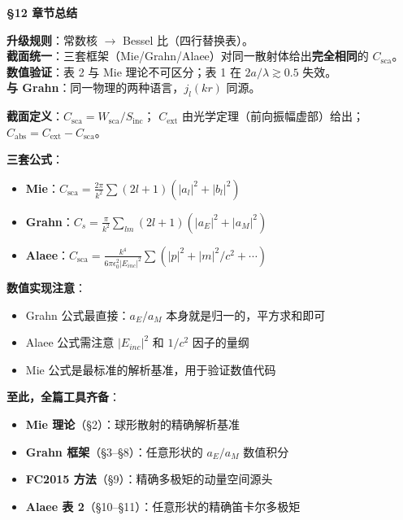 \begin{chaptersummary}

\textbf{\S12 章节总结}

\textbf{升级规则}：常数核 $\to$ Bessel 比（四行替换表）。\\
\textbf{截面统一}：三套框架（Mie/Grahn/Alaee）对同一散射体给出\textbf{完全相同}的 $C_{\text{sca}}$。\\
\textbf{数值验证}：表 2 与 Mie 理论不可区分；表 1 在 $2a/\lambda\gtrsim0.5$ 失效。\\
\textbf{与 Grahn}：同一物理的两种语言，$j_l(kr)$ 同源。

\textbf{截面定义}：$C_{\text{sca}} = W_{\text{sca}}/S_{\text{inc}}$；
$C_{\text{ext}}$ 由光学定理（前向振幅虚部）给出；$C_{\text{abs}}=C_{\text{ext}}-C_{\text{sca}}$。

\textbf{三套公式}：
\begin{itemize}
  \item \textbf{Mie}：$C_{\text{sca}}=\frac{2\pi}{k^2}\sum(2l+1)(|a_l|^2+|b_l|^2)$
  \item \textbf{Grahn}：$C_s=\frac{\pi}{k^2}\sum_{lm}(2l+1)(|a_E|^2+|a_M|^2)$
  \item \textbf{Alaee}：$C_{\text{sca}}=\frac{k^4}{6\pi\epsilon_0^2|E_{inc}|^2}\sum(|p|^2+|m|^2/c^2+\cdots)$
\end{itemize}

\textbf{数值实现注意}：
\begin{itemize}
  \item Grahn 公式最直接：$a_E/a_M$ 本身就是归一的，平方求和即可
  \item Alaee 公式需注意 $|E_{inc}|^2$ 和 $1/c^2$ 因子的量纲
  \item Mie 公式是最标准的解析基准，用于验证数值代码
\end{itemize}

\textbf{至此，全篇工具齐备}：
\begin{itemize}
  \item \textbf{Mie 理论}（\S2）：球形散射的精确解析基准
  \item \textbf{Grahn 框架}（\S3--\S8）：任意形状的 $a_E/a_M$ 数值积分
  \item \textbf{FC2015 方法}（\S9）：精确多极矩的动量空间源头
  \item \textbf{Alaee 表 2}（\S10--\S11）：任意形状的精确笛卡尔多极矩
\end{itemize}

\end{chaptersummary}

\newpage
